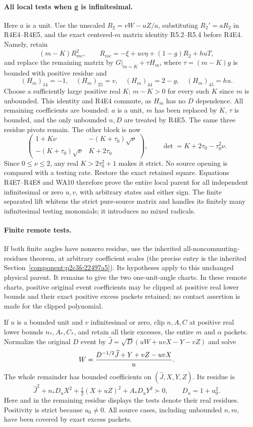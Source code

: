 \paragraph{All local tests when g is infinitesimal.}
Here $a$ is a unit. Use the unscaled $R_2=vW-uZ/a$, substituting
$R_2'=aR_2$ in R4E4--R4E5, and the exact
centered-$m$ matrix identity R5.2--R5.4 before R4E4. Namely, retain
\[
 (m-K)R_{mc}^2,\qquad R_{mc}=-\xi+uv\eta+(1-g)R_2+huT,
\]
and replace the remaining matrix by
$G|_{m=K}+\tau H_m$, where $\tau=(m-K)g$ is bounded with positive
residue and
\[
 (H_m)_{14}=-1,\quad(H_m)_{25}=v,\quad
 (H_m)_{44}=2-g,\quad(H_m)_{45}=hu.
\]
Choose a sufficiently large positive real $K$; $m-K>0$ for every
such $K$ since $m$ is unbounded. This identity and R4E4 commute,
as $H_m$ has no $D$ dependence. All remaining coefficients are
bounded: $a$ is a unit, $m$ has been replaced by $K$, $\tau$ is
bounded, and the only unbounded $n,D$ are treated by R4E5.
The same three residue pivots remain. The other block is now
\[
 \begin{pmatrix}
 1+K\nu&-(K+\tau_0)\sqrt\nu\\
 -(K+\tau_0)\sqrt\nu&K+2\tau_0
 \end{pmatrix},\qquad
 \det=K+2\tau_0-\tau_0^2\nu.                         \tag{R4E8}
\]
Since $0\le\nu\le2$, any real $K>2\tau_0^2+1$ makes it strict.
No source opening is compared with a testing rate. Restore the exact
retained square. Equations R4E7--R4E8 and WA10 therefore prove the
entire local parent for all independent infinitesimal or zero $u,v$,
with arbitrary states and either sign. The finite separated lift
whitens the strict pure-source matrix and handles its finitely many
infinitesimal testing monomials; it introduces no mixed radicals.

\paragraph{Finite remote tests.}
If both finite angles have nonzero residue, use the inherited
all-noncommuting-residues theorem, at arbitrary coefficient scales
(the precise entry is the inherited Section~\ref{component:p2c3fc22497a5}).
Its hypotheses apply to this unchanged physical parent. It remains
to give the two one-unit-angle charts. In these remote charts,
positive original event coefficients may be clipped at positive real
lower bounds and their exact positive excess packets retained; no
contact assertion is made for the clipped polynomial.

If $u$ is a bounded unit and $v$ infinitesimal or zero, clip $n,A,C$
at positive real lower bounds $n_*,A_*,C_*$, and retain all their
excesses, the entire $m$ and $\alpha$ packets. Normalize the original
$D$ event by $\widehat J=\sqrt D(uW+uvX-Y-vZ)$ and solve
\[
 W={D^{-1/2}\widehat J+Y+vZ-uvX\over u}.
\]
The whole remainder has bounded coefficients on
$(\widehat J,X,Y,Z)$. Its residue is
\[
 \widehat J^2+n_*D_uX^2+\tfrac12(X+uZ)^2+A_*D_uY^2\succ0,
 \qquad D_u=1+u_0^2.                                \tag{R4E9}
\]
Here and in the remaining residue displays the tests denote their real
residues. Positivity is strict because $u_0\ne0$. All source cases,
including unbounded $n,m$, have been covered by exact excess packets.

